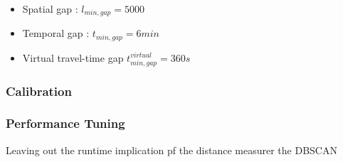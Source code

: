 \documentclass[a4paper,headsepline,footsepline,fontsize=11pt,BCOR=12mm,DIV=12]{report}
\begin{document}
\begin{itemize}
	\item Spatial gap : $l_{min,gap} = 5000$ %
	\item Temporal gap : $t_{min,gap} = 6 min$ %
	\item Virtual travel-time gap $t_{min,gap}^{virtual} = 360s$
\end{itemize}

\subsubsection{Calibration}


\subsubsection{Performance Tuning}
Leaving out the runtime implication pf the distance measurer the DBSCAN 
\end{document}
